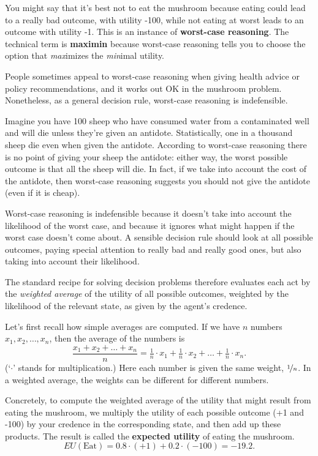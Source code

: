 You might say that it's best not to eat the mushroom because eating
could lead to a really bad outcome, with utility -100, while not
eating at worst leads to an outcome with utility -1. This is an
instance of \textbf{worst-case reasoning}. The technical term is
\textbf{maximin} because worst-case reasoning tells you to choose the
option that \emph{max}imizes the \emph{min}imal utility.

People sometimes appeal to worst-case reasoning when giving health
advice or policy recommendations, and it works out OK in the mushroom
problem. Nonetheless, as a general decision rule, worst-case reasoning
is indefensible. 

Imagine you have 100 sheep who have consumed water from a contaminated
well and will die unless they're given an antidote. Statistically, one
in a thousand sheep die even when given the antidote. According to
worst-case reasoning there is no point of giving your
sheep the antidote: either way, the worst possible outcome is that all
the sheep will die. In fact, if we take into account the cost of the
antidote, then worst-case reasoning suggests you should not give the
antidote (even if it is cheap).

Worst-case reasoning is indefensible because it doesn't take into
account the likelihood of the worst case, and because it ignores what
might happen if the worst case doesn't come about. A sensible decision
rule should look at all possible outcomes, paying special attention to
really bad and really good ones, but also taking into account their
likelihood.

The standard recipe for solving decision problems therefore evaluates
each act by the \emph{weighted average} of the utility of all possible
outcomes, weighted by the likelihood of the relevant state, as given
by the agent's credence.

Let's first recall how simple averages are computed. If we have $n$
numbers $x_1, x_2, \ldots, x_n$, then the average of the numbers is
\[
\frac{x_1 + x_2 + \ldots + x_n}{n} = \tfrac{1}{n}\cdot x_1 + \tfrac{1}{n}\cdot x_2 + \ldots + \tfrac{1}{n}\cdot x_n.
\]
(`$\cdot$' stands for multiplication.) Here each number is given the
same weight, $\nicefrac{1}{n}$. In a weighted average, the weights can
be different for different numbers.

Concretely, to compute the weighted average of the utility that might
result  from eating the mushroom, we multiply the utility of each
possible outcome (+1 and -100) by your credence in the corresponding
state, and then add up these products. The result is called the
\textbf{expected utility} of eating the mushroom.
\[
EU(\text{Eat}) = 0.8 \cdot (+1) + 0.2 \cdot (-100) = -19.2.
\]

